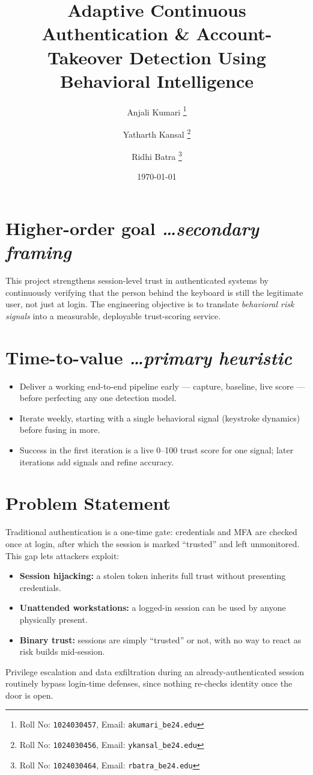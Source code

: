 \documentclass[11pt,a4paper]{article}
\title{Adaptive Continuous Authentication \& Account-Takeover Detection Using Behavioral Intelligence}
\author{ 
  Anjali Kumari 
  \thanks{Roll No: \texttt{1024030457}, %
    Email: \texttt{akumari\_be24\@thapar.edu}} 
  \and 
  Yatharth Kansal 
  \thanks{Roll No: \texttt{1024030456}, %
    Email: \texttt{ykansal\_be24\@thapar.edu}} 
  \and 
  Ridhi Batra 
  \thanks{Roll No: \texttt{1024030464}, %
    Email: \texttt{rbatra\_be24\@thapar.edu}} 
}
\date{\today}
\newcommand{\BvrHint}[1]{%
  {\normalfont\normalsize\itshape\hfill #1}}
\begin{document}
 
\maketitle 
 
\section{Higher-order goal%
  \BvrHint{\ldots secondary framing}} 
This project strengthens session-level trust in authenticated systems 
by continuously verifying that the person behind the keyboard is 
still the legitimate user, not just at login. The engineering 
objective is to translate \emph{behavioral risk signals} into a 
measurable, deployable trust-scoring service. 
 
\section{Time-to-value%
  \BvrHint{\ldots primary heuristic}} 
\begin{itemize}[leftmargin=0.7cm] 
    \item Deliver a working end-to-end pipeline early --- capture, baseline, live score --- before perfecting any one detection model. 
    \item Iterate weekly, starting with a single behavioral signal (keystroke dynamics) before fusing in more. 
    \item Success in the first iteration is a live 0--100 trust score for one signal; later iterations add signals and refine accuracy. 
\end{itemize} 
 
\section{Problem Statement} 
Traditional authentication is a one-time gate: credentials and MFA 
are checked once at login, after which the session is marked 
``trusted'' and left unmonitored. This gap lets attackers exploit: 
\begin{itemize}[leftmargin=0.7cm] 
    \item \textbf{Session hijacking:} a stolen token inherits full trust without presenting credentials. 
    \item \textbf{Unattended workstations:} a logged-in session can be used by anyone physically present. 
    \item \textbf{Binary trust:} sessions are simply ``trusted'' or not, with no way to react as risk builds mid-session. 
\end{itemize} 
Privilege escalation and data exfiltration during an already-authenticated 
session routinely bypass login-time defenses, since nothing re-checks 
identity once the door is open. 
 
\end{document}
